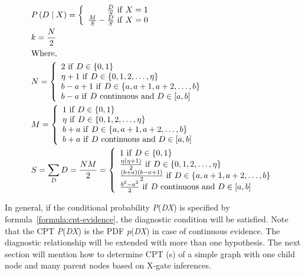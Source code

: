 \documentclass{article}
\numberwithin{equation}{section}
\numberwithin{figure}{section}
\numberwithin{table}{section}
\begin{document}
\begin{equation}
\begin{split}
&P\left(D\mathrel{\left|\vphantom{D X}\right.\kern-\nulldelimiterspace}X\right)=\left\{ \begin{array}{r}
\frac{D}{S}\ \mathrm{if}\ X=1 \\ 
\frac{M}{S}-\frac{D}{S}\ \mathrm{if}\ X=0 \end{array}
\right.\\
&k=\frac{N}{2}\\
&\mathrm{Where,}\\
&N=\left\{ \begin{array}{l}
2\ \mathrm{if}\ D\in \left\{0,1\right\} \\ 
\eta +1\ \mathrm{if}\ D\in \left\{0,1,2,\dots ,\eta \right\} \\ 
b-a+1\ \mathrm{if}\ D\in \left\{a,a+1,a+2,\dots ,b\right\} \\ 
b-a\ \mathrm{if}\ D\ \mathrm{continuous\ and}\ D\in \left[a,b\right] \end{array}
\right.\\
&M=\left\{ \begin{array}{l}
1\ \mathrm{if}\ D\in \left\{0,1\right\} \\ 
\eta \ \mathrm{if}\ D\in \left\{0,1,2,\dots ,\eta \right\} \\ 
b+a\ \mathrm{if}\ D\in \left\{a,a+1,a+2,\dots ,b\right\} \\ 
b+a\ \mathrm{if}\ D\ \mathrm{continuous\ and}\ D\in \left[a,b\right] \end{array}
\right.\\
&S=\sum_D{D}=\frac{NM}{2}=\left\{ \begin{array}{l}
1\ \mathrm{if}\ D\in \left\{0,1\right\} \\ 
\frac{\eta \left(\eta +1\right)}{2}\ \mathrm{if}\ D\in \left\{0,1,2,\dots ,\eta \right\} \\ 
\frac{\left(b+a\right)\left(b-a+1\right)}{2}\ \mathrm{if}\ D\in \left\{a,a+1,a+2,\dots ,b\right\} \\ 
\frac{b^2-a^2}{2}\ \mathrm{if}\ D\ \mathrm{continuous\ and}\ D\in \left[a,b\right] \end{array}
\right.
\end{split}
\label{formula:cpt-evidence}
\end{equation}

In general, if the conditional probability \textit{P}(\textit{D{\textbar}X}) is specified by formula~\ref{formula:cpt-evidence}, the diagnostic condition will be satisfied. Note that the CPT \textit{P}(\textit{D{\textbar}X}) is the PDF \textit{p}(\textit{D{\textbar}X}) in case of continuous evidence. The diagnostic relationship will be extended with more than one hypothesis. The next section will mention how to determine CPT (s) of a simple graph with one child node and many parent nodes based on X-gate inferences.
\end{document}
